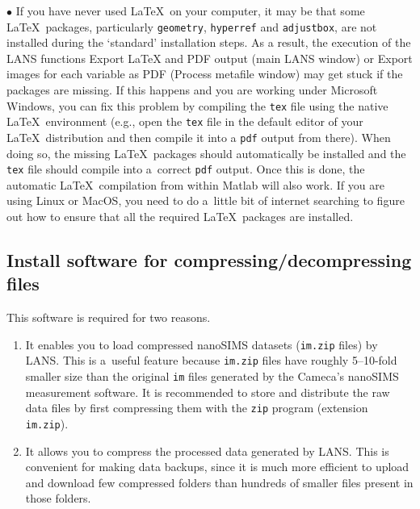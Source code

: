 \documentclass[a4paper, 11pt]{article}
\newcommand{\ttt}[1]{\texttt{#1}}
\newcommand{\lans}[1]{{\color{magenta}#1}}
\newcounter{step}
\newcommand\bul{\vskip5pt\noindent$\bullet${ }}
\begin{document}
\bul
If you have never used \LaTeX\ on your computer, it may be that some \LaTeX\ packages, parti\-cu\-larly \ttt{geometry}, \ttt{hyperref} and \ttt{adjustbox}, are not installed during the `standard' installation steps. As a result, the execution of the LANS functions \lans{Export LaTeX and PDF output} (main LANS window) or \lans{Export images for each variable as PDF} (Process metafile window) may get stuck if the packages are missing. If this happens and you are working under Microsoft Windows, you can fix this problem by compiling the \ttt{tex} file using the native \LaTeX\ environment (e.g., open the \ttt{tex} file in the default editor of your \LaTeX\ distribution and then compile it into a \ttt{pdf} output from there). When doing so, the missing \LaTeX\ packages should automatically be installed and the \ttt{tex} file should compile into a~correct \ttt{pdf} output. Once this is done, the automatic \LaTeX\ compilation from within Matlab will also work. If you are using Linux or MacOS, you need to do a~little bit of internet searching to figure out how to ensure that all the required \LaTeX\ packages are installed.


\subsection{Install software for compressing/decompressing files}
\setcounter{step}{0}

This software is required for two reasons.

\begin{enumerate}
 
\item It enables you to load compressed nanoSIMS datasets (\ttt{im.zip} files) by LANS. This is a~useful feature because \ttt{im.zip} files have roughly 5--10-fold smaller size than the original \ttt{im} files generated by the Cameca's nanoSIMS measurement software. It is recommended to store and distribute the raw data files by first compressing them with the \ttt{zip} program (extension \ttt{im.zip}). 

\item It allows you to compress the processed data generated by LANS. This is convenient for making data backups, since it is much more efficient to upload and download few compressed folders than hundreds of smaller files present in those folders.

\end{enumerate}
\end{document}
